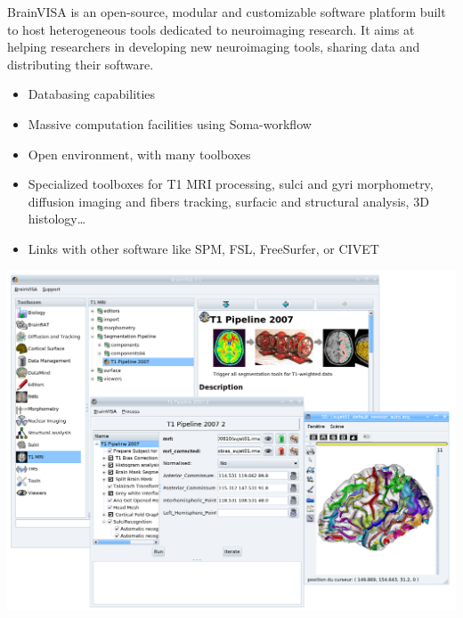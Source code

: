 \begin{multicols}{3}

%



BrainVISA is an open-source, modular and customizable software platform built
to host heterogeneous tools dedicated to neuroimaging research. It aims at
helping researchers in developing new neuroimaging tools, sharing data and
distributing their software.
\begin{itemize}[nolistsep,topsep=0em,leftmargin=1pc]
\item Databasing capabilities
\item Massive computation facilities using Soma-workflow
\item Open environment, with many toolboxes
\item Specialized toolboxes for T1 MRI processing, sulci and gyri morphometry,
diffusion imaging and fibers tracking, surfacic and structural analysis,
3D histology\ldots
\item Links with other software like SPM, FSL, FreeSurfer, or CIVET
\end{itemize}
\includegraphics[width=\columnwidth]{../pics/brainvisa_screenshot.png}


\end{multicols}
